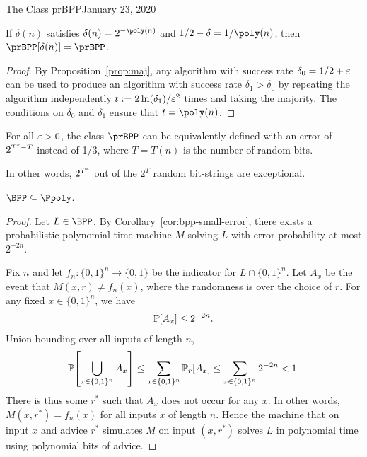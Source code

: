 \begin{lecture}{1}{The Class prBPP}{January 23, 2020}
\begin{corollary}\label{cor:bpp-small-error}
  If $\delta(n)$ satisfies $\delta(n) = 2^{-\poly(n)}$ and $1/2 - \delta =
  1/\poly(n)$, then $\prBPP[\delta(n)] = \prBPP$.
\end{corollary}

\begin{proof}
  By Proposition~\ref{prop:maj}, any algorithm with success rate $\delta_0 =
  1/2 + \varepsilon$ can be used to produce an algorithm with success rate $\delta_1 >
  \delta_0$ by repeating the algorithm independently $t :=
  2\ln(\delta_1)/\varepsilon^2$ times and taking the majority. The conditions on
  $\delta_0$ and $\delta_1$ ensure that $t = \poly(n)$.
\end{proof}

\begin{corollary}\label{cor:bpp-small-random}
  For all $\varepsilon > 0$, the class $\prBPP$ can be equivalently defined with an
  error of $2^{T^\varepsilon - T}$ instead of 1/3, where $T = T(n)$ is the number of
  random bits.

  In other words, $2^{T^\varepsilon}$ out of the $2^T$ random bit-strings are exceptional.
\end{corollary}

\begin{corollary}
  $\BPP \subseteq \Ppoly$.
\end{corollary}

\begin{proof}
    Let $L \in \BPP$. By Corollary~\ref{cor:bpp-small-error}, there exists a
    probabilistic polynomial-time machine $M$ solving $L$ with error
    probability at most $2^{-2n}$.

    Fix $n$ and let $f_n : \{0, 1\}^n \to \{0, 1\}$ be the indicator for $L
    \cap \{0, 1\}^n$. Let $A_x$ be the event that $M(x, r) \ne f_n(x)$, where
    the randomness is over the choice of $r$. For any fixed $x \in \{0, 1\}^n$,
    we have
    \begin{align*}
      \Pr\brac*{A_x} \leq 2^{-2n}.
    \end{align*}
    Union bounding over all inputs of length $n$, \[
      \Pr\brac*{\bigcup_{x \in \set{0, 1}^n} A_x}
      \leq \sum_{x \in \set{0,1}^n} \Pr_r\brac*{A_x}
      \leq \sum_{x \in \set{0,1}^n} 2^{-2n}
      < 1.
    \]
    There is thus some $r^*$ such that $A_x$ does not occur for any $x$. In
    other words, $M(x,r^*) = f_n(x)$ for all inputs $x$ of length $n$. Hence the
    machine that on input $x$ and advice $r^*$ simulates $M$ on input $(x,
    r^*)$ solves $L$ in polynomial time using polynomial bits of advice.
\end{proof}



\end{lecture}

